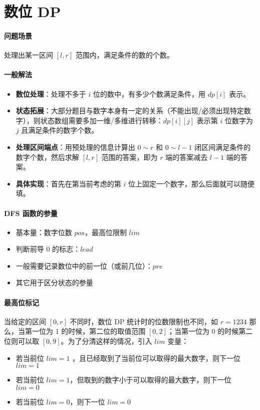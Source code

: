 \section{数位 DP}
\paragraph{问题场景} 处理出某一区间 $[l, r]$ 范围内，满足条件的数的个数。

\paragraph{一般解法}

\begin{itemize}
    \item \textbf{数位处理}：处理不多于 $i$ 位的数中，有多少个数满足条件，用 $dp[i]$ 表示。
    \item \textbf{状态拓展}：大部分题目与数字本身有一定的关系（不能出现/必须出现特定数字），则状态数组需要多加一维/多维进行转移：$dp[i][j]$ 表示第 $i$ 位数字为 $j$ 且满足条件的数字个数。
    \item \textbf{处理区间端点}：用预处理的信息计算出 $0 \sim r$ 和 $0 \sim l-1$ 闭区间满足条件的数字个数，然后求解 $[l, r]$ 范围的答案，即为 $r$ 端的答案减去 $l-1$ 端的答案。
    \item \textbf{具体实现}：首先在第当前考虑的第 $i$ 位上固定一个数字，那么后面就可以随便填。
\end{itemize}

\paragraph{DFS 函数的参量}
\begin{itemize}
\item 基本量：数字位数 $pos$，最高位限制 $lim$
\item 判断前导 0 的标志：$lead$
\item 一般需要记录数位中的前一位（或前几位）：$pre$
\item 其它用于区分状态的参量
\end{itemize}

\paragraph{最高位标记}

当给定的区间 $[0, r]$ 不同时，数位 DP 统计时的位数限制也不同，如 $r=1234$ 那么，当第一位为 1 的时候，第二位的取值范围 $[0, 2]$；当第一位为 0 的时候第二位则可以取 $[0, 9]$。为了分清这样的情况，引入 $lim$ 变量：
\begin{itemize}
    \item 若当前位 $lim = 1$ ，且已经取到了当前位可以取得的最大数字，则下一位 $lim = 1$
    \item 若当前位 $lim = 1$，但取到的数字小于可以取得的最大数字，则下一位 $lim = 0$
    \item 若当前位 $lim = 0$，则下一位 $lim = 0$
\end{itemize}

